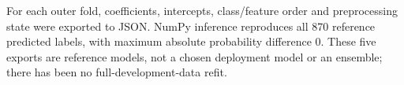 For each outer fold, coefficients, intercepts, class/feature order and preprocessing state were exported to JSON. NumPy inference reproduces all 870 reference predicted labels, with maximum absolute probability difference 0. These five exports are reference models, not a chosen deployment model or an ensemble; there has been no full-development-data refit.
